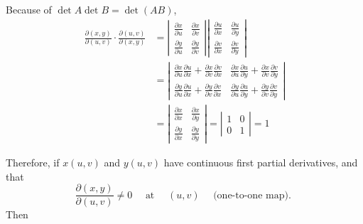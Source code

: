 \begin{spacing}{1.3}
    Because of $\det A \det B=\det(AB)$, 
    \begin{align*}
        \frac{\partial(x, y)}{\partial(u, v)} \cdot \frac{\partial(u, v)}{\partial(x, y)} 
        &= \left|\begin{array}{ll}\frac{\partial x}{\partial u} & \frac{\partial x}{\partial v} \\ 
            \frac{\partial y}{\partial u} & \frac{\partial y}{\partial v}\end{array} \right| 
            \left|  \begin{array}{ll}\frac{\partial u}{\partial x} & \frac{\partial u}{\partial y} \\ 
                \frac{\partial v}{\partial x} & \frac{\partial v}{\partial y}\end{array}\right|\\
        &= \left|\begin{array}{ll}\frac{\partial x}{\partial u} \frac{\partial u}{\partial x}+\frac{\partial x}{\partial v} \frac{\partial v}{\partial x} & 
            \frac{\partial x}{\partial u} \frac{\partial u}{\partial y}+\frac{\partial x}{\partial v} \frac{\partial v}{\partial y} \\ 
            \frac{\partial y}{\partial u} \frac{\partial u}{\partial x}+\frac{\partial y}{\partial v} \frac{\partial v}{\partial x} & 
            \frac{\partial y}{\partial u} \frac{\partial u}{\partial y}+\frac{\partial y}{\partial v} \frac{\partial v}{\partial y}\end{array}\right| \\ 
        &=\left|\begin{array}{ll}\frac{\partial x}{\partial x} & \frac{\partial x}{\partial y} \\ 
                \frac{\partial y}{\partial x} & \frac{\partial y}{\partial y}\end{array}\right|
        =\left|\begin{array}{cc}1 & 0 \\ 0 & 1\end{array}\right|=1
    \end{align*}

    Therefore, if $x(u,v)$ and $y(u,v)$ have continuous first partial derivatives, and that 
    $$\frac{\partial(x, y)}{\partial(u, v)} \neq 0 \quad \text { at } \quad(u, v) \quad \text { (one-to-one map). }$$
    Then
    \begin{center}
    \end{center}


\end{spacing}
